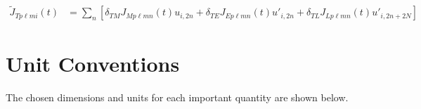 \documentclass{article}
\begin{document}
\begin{equation}
\begin{split}
\tilde{J}_{Tp\ell mi}(t) &= \sum_n\left[\delta_{TM}J_{Mp\ell mn}(t)u_{i,2n} + \delta_{TE}J_{Ep\ell mn}(t)u'_{i,2n} + \delta_{TL}J_{Lp\ell mn}(t)u'_{i,2n+2N}\right]
\end{split}
\end{equation}

 






















\newpage
% 



























\newpage
\appendix
{}

\section{Unit Conventions}\label{app:unitConventions}

The chosen dimensions and units for each important quantity are shown below.
\end{document}
